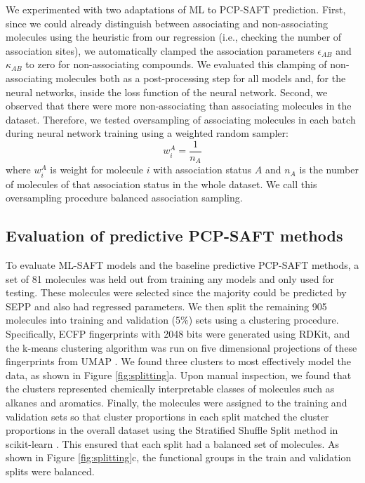 We experimented with two adaptations of ML to PCP-SAFT prediction. First, since we could already distinguish between associating and non-associating molecules using the heuristic from our regression (i.e., checking the number of association sites), we automatically clamped the association parameters $\epsilon_{AB}$ and $\kappa_{AB}$ to zero for non-associating compounds. We evaluated this clamping of non-associating molecules both as a post-processing step for all models and, for the neural networks, inside the loss function of the neural network. Second, we observed that there were more non-associating than associating molecules in the dataset. Therefore, we tested oversampling of associating molecules in each batch during neural network training using a weighted random sampler:
\begin{equation}
    w_i^{A} = \frac{1}{n_A}
\end{equation}
where $w_i^{A}$ is weight for molecule $i$ with association status $A$ and $n_A$ is the number of molecules of that association status in the whole dataset. We call this oversampling procedure balanced association sampling.

\subsection{Evaluation of predictive PCP-SAFT methods}

To evaluate ML-SAFT models and the baseline predictive PCP-SAFT methods, a set of 81 molecules was held out from training any models and only used for testing. These molecules were selected since the majority could be predicted by SEPP and also had regressed parameters. We then split the remaining 905 molecules into training and validation (5\%) sets using a clustering procedure. Specifically, ECFP fingerprints with 2048 bits were generated using RDKit, and the k-means clustering algorithm\cite{MacQueen1967} was run on five dimensional projections of these fingerprints from UMAP \cite{McInnes2018}. We found three clusters to most effectively model the data, as shown in Figure \ref{fig:splitting}a. Upon manual inspection, we found that the clusters represented chemically interpretable classes of molecules such as alkanes and aromatics. Finally, the molecules were assigned to the training and validation sets so that cluster proportions in each split matched the cluster proportions in the overall dataset using the Stratified Shuffle Split method in scikit-learn \cite{scikit-learn}. This ensured that each split had a balanced set of molecules. As shown in Figure \ref{fig:splitting}c, the functional groups in the train and validation splits were balanced. 


